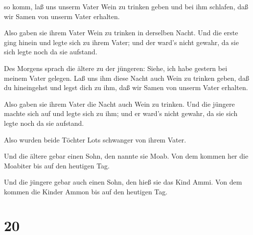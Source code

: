  so komm, laß uns unserm Vater Wein zu trinken geben und
bei ihm schlafen, daß wir Samen von unserm Vater erhalten.

 Also gaben sie ihrem Vater Wein zu trinken in derselben
Nacht. Und die erste ging hinein und legte sich zu ihrem Vater; und der
ward's nicht gewahr, da sie sich legte noch da sie aufstand.

 Des Morgens sprach die ältere zu der jüngeren: Siehe, ich
habe gestern bei meinem Vater gelegen. Laß uns ihm diese Nacht auch Wein
zu trinken geben, daß du hineingehst und legst dich zu ihm, daß wir
Samen von unserm Vater erhalten.

 Also gaben sie ihrem Vater die Nacht auch Wein zu trinken.
Und die jüngere machte sich auf und legte sich zu ihm; und er ward's
nicht gewahr, da sie sich legte noch da sie aufstand.

 Also wurden beide Töchter Lots schwanger von ihrem Vater.

 Und die ältere gebar einen Sohn, den nannte sie Moab. Von
dem kommen her die Moabiter bis auf den heutigen Tag.

 Und die jüngere gebar auch einen Sohn, den hieß sie das
Kind Ammi. Von dem kommen die Kinder Ammon bis auf den heutigen Tag.

\hypertarget{section-19}{%
\section{20}\label{section-19}}

